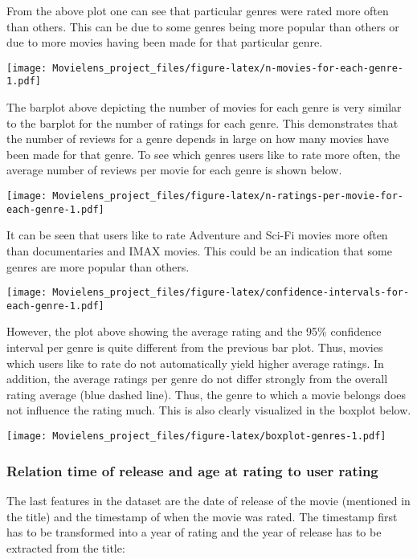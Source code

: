 \documentclass[
]{article}
\begin{document}
From the above plot one can see that particular genres were rated more
often than others. This can be due to some genres being more popular
than others or due to more movies having been made for that particular
genre.

\texttt{[image: Movielens\_project\_files/figure-latex/n-movies-for-each-genre-1.pdf]}

The barplot above depicting the number of movies for each genre is very
similar to the barplot for the number of ratings for each genre. This
demonstrates that the number of reviews for a genre depends in large on
how many movies have been made for that genre. To see which genres users
like to rate more often, the average number of reviews per movie for
each genre is shown below.

\texttt{[image: Movielens\_project\_files/figure-latex/n-ratings-per-movie-for-each-genre-1.pdf]}

It can be seen that users like to rate Adventure and Sci-Fi movies more
often than documentaries and IMAX movies. This could be an indication
that some genres are more popular than others.

\texttt{[image: Movielens\_project\_files/figure-latex/confidence-intervals-for-each-genre-1.pdf]}

However, the plot above showing the average rating and the 95\%
confidence interval per genre is quite different from the previous bar
plot. Thus, movies which users like to rate do not automatically yield
higher average ratings. In addition, the average ratings per genre do
not differ strongly from the overall rating average (blue dashed line).
Thus, the genre to which a movie belongs does not influence the rating
much. This is also clearly visualized in the boxplot below.

\texttt{[image: Movielens\_project\_files/figure-latex/boxplot-genres-1.pdf]}

\hypertarget{relation-time-of-release-and-age-at-rating-to-user-rating}{%
\subsubsection{Relation time of release and age at rating to user
rating}\label{relation-time-of-release-and-age-at-rating-to-user-rating}}

The last features in the dataset are the date of release of the movie
(mentioned in the title) and the timestamp of when the movie was rated.
The timestamp first has to be transformed into a year of rating and the
year of release has to be extracted from the title:
\end{document}
